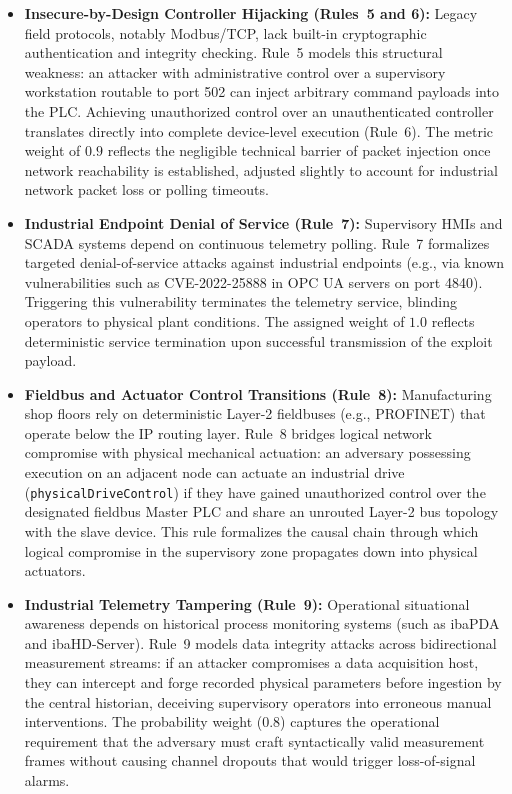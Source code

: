 \documentclass[target=mst,aauheader=aics,style=]{thud}
\begin{document}
\begin{itemize}
    \item \textbf{Insecure-by-Design Controller Hijacking (Rules~5 and 6):} Legacy field protocols, notably Modbus/TCP, lack built-in cryptographic authentication and integrity checking. Rule~5 models this structural weakness: an attacker with administrative control over a supervisory workstation routable to port 502 can inject arbitrary command payloads into the PLC. Achieving unauthorized control over an unauthenticated controller translates directly into complete device-level execution (Rule~6). The metric weight of $0.9$ reflects the negligible technical barrier of packet injection once network reachability is established, adjusted slightly to account for industrial network packet loss or polling timeouts.
    
    \item \textbf{Industrial Endpoint Denial of Service (Rule~7):} Supervisory HMIs and SCADA systems depend on continuous telemetry polling. Rule~7 formalizes targeted denial-of-service attacks against industrial endpoints (e.g., via known vulnerabilities such as CVE-2022-25888 in OPC UA servers on port 4840). Triggering this vulnerability terminates the telemetry service, blinding operators to physical plant conditions. The assigned weight of $1.0$ reflects deterministic service termination upon successful transmission of the exploit payload.

    \item \textbf{Fieldbus and Actuator Control Transitions (Rule~8):} Manufacturing shop floors rely on deterministic Layer-2 fieldbuses (e.g., PROFINET) that operate below the IP routing layer. Rule~8 bridges logical network compromise with physical mechanical actuation: an adversary possessing execution on an adjacent node can actuate an industrial drive (\texttt{physicalDriveControl}) if they have gained unauthorized control over the designated fieldbus Master PLC and share an unrouted Layer-2 bus topology with the slave device. This rule formalizes the causal chain through which logical compromise in the supervisory zone propagates down into physical actuators.

    \item \textbf{Industrial Telemetry Tampering (Rule~9):} Operational situational awareness depends on historical process monitoring systems (such as ibaPDA and ibaHD-Server). Rule~9 models data integrity attacks across bidirectional measurement streams: if an attacker compromises a data acquisition host, they can intercept and forge recorded physical parameters before ingestion by the central historian, deceiving supervisory operators into erroneous manual interventions. The probability weight ($0.8$) captures the operational requirement that the adversary must craft syntactically valid measurement frames without causing channel dropouts that would trigger loss-of-signal alarms.
\end{itemize}
\end{document}
